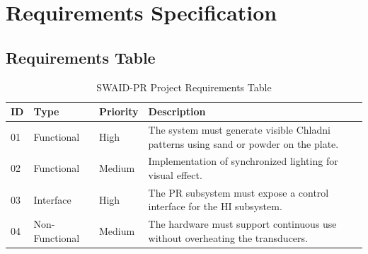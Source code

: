 \section{Requirements Specification}

\subsection{Requirements Table}

\begin{table}[h]
    \centering
    \small
    \begin{tabular}{@{}lllp{8cm}@{}}
        \toprule
        \textbf{ID} & \textbf{Type} & \textbf{Priority} & \textbf{Description} \\ \midrule
        01 & Functional & High & The system must generate visible Chladni patterns using sand or powder on the plate. \\
        02 & Functional & Medium & Implementation of synchronized lighting for visual effect. \\
        03 & Interface & High & The PR subsystem must expose a control interface for the HI subsystem. \\
        04 & Non-Functional & Medium & The hardware must support continuous use without overheating the transducers. \\ \bottomrule
    \end{tabular}
    \caption{SWAID-PR Project Requirements Table}
\end{table}